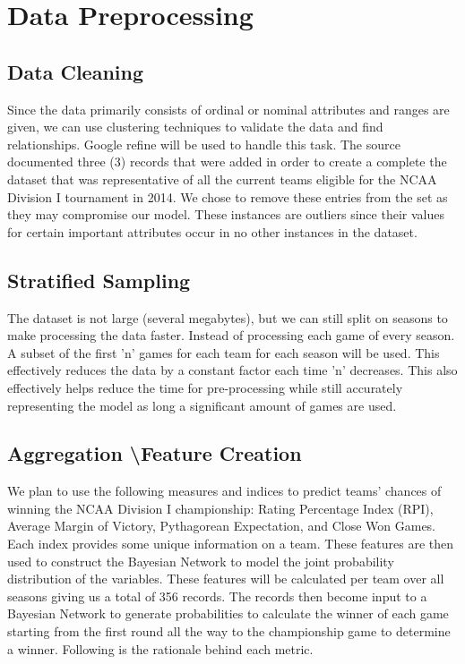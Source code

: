 \documentclass{acm_proc_article-sp}
\begin{document}
\section{Data Preprocessing}
\subsection{Data Cleaning}
Since the data primarily consists of ordinal or nominal attributes and ranges are given, we can use 
clustering techniques to validate the data and find relationships. Google refine will be 
used to handle this task. The source documented three (3) records that were added in order to create a complete the dataset that was representative of all the current teams eligible for the NCAA Division I tournament in 2014. We chose to remove these entries from the set as they may compromise our model. These instances are outliers since their values for certain important attributes occur in no other instances in the dataset.
\subsection{Stratified Sampling}
The dataset is not large (several megabytes), but we can still split on seasons to make processing 
the data faster. Instead of processing each game of every season. A subset of the first 'n' games 
for each team for each season will be used. This effectively reduces the data by a constant 
factor each time 'n' decreases. This also effectively helps reduce the time 
for pre-processing while still accurately representing the model as long a significant amount of 
games are used.
\subsection{Aggregation \textbackslash Feature Creation}
We plan to use the following measures and indices to predict teams' chances of winning the NCAA 
Division I championship: Rating Percentage Index (RPI), Average Margin of Victory, Pythagorean 
Expectation, and Close Won Games. Each index provides some unique information on a team. 
These features are then used to construct the Bayesian Network to model the joint probability 
distribution of the variables. These features will be calculated per team over all seasons giving us 
a total of 356 records. The records then become input to a Bayesian Network to generate 
probabilities to calculate the winner of each game starting from the first round all the way to the 
championship game to determine a winner. Following is the rationale behind each metric.
\end{document}
